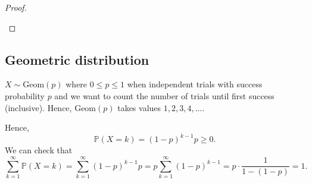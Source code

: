 \begin{proof}
\begin{figure}[H]
    \end{figure}

\end{proof}

\subsection{Geometric distribution}
\begin{definition}
    \(X \sim \mathrm{Geom}(p) \) where \(0 \le p \le 1\) when independent trials with success probability \(p\) and we want to count the number of trials until first success (inclusive). Hence, \(\mathrm{Geom}(p) \) takes values \(1, 2, 3, 4, \dots \).     
\end{definition}

Hence,
\[
    \mathbb{P} (X = k) = (1 - p)^{k-1} p \ge 0.
\]
We can check that 
\[
    \sum_{k=1}^{\infty} \mathbb{P} (X = k) = \sum_{k=1}^{\infty} (1 - p)^{k-1} p = p \sum_{k=1}^{\infty} (1-p)^{k-1} = p \cdot \frac{1}{1 - (1 - p)} = 1.  
\]